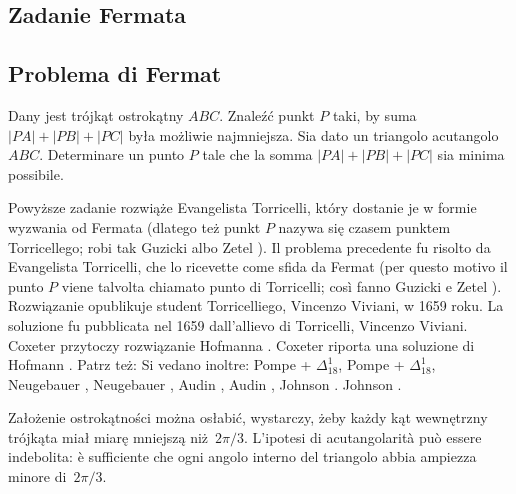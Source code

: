 %

\subsection{Zadanie Fermata} %
\subsection{Problema di Fermat} %

\begin{problem}
[zadanie Fermata] %
[problema di Fermat] %
\label{punkt_fermata}%
	Dany jest trójkąt ostrokątny $ABC$. %
	Znaleźć punkt $P$ taki, by suma $|PA| + |PB| + |PC|$ była możliwie najmniejsza. %
	Sia dato un triangolo acutangolo $ABC$. %
	Determinare un punto $P$ tale che la somma $|PA| + |PB| + |PC|$ sia minima possibile. %
\end{problem}

Powyższe zadanie rozwiąże Evangelista Torricelli, który dostanie je w formie wyzwania od Fermata (dlatego też punkt $P$ nazywa się czasem punktem Torricellego; robi tak Guzicki \cite[s. 224-228]{guzicki_2021} albo Zetel \cite[s. 157-164]{zetel_2020}). %
Il problema precedente fu risolto da Evangelista Torricelli, che lo ricevette come sfida da Fermat (per questo motivo il punto $P$ viene talvolta chiamato punto di Torricelli; così fanno Guzicki \cite[pp. 224-228]{guzicki_2021} e Zetel \cite[pp. 157-164]{zetel_2020}). %
Rozwiązanie opublikuje student Torricelliego, Vincenzo Viviani, w 1659 roku. %
La soluzione fu pubblicata nel 1659 dall'allievo di Torricelli, Vincenzo Viviani. %
Coxeter \cite[s. 37]{coxeter_1967} przytoczy rozwiązanie Hofmanna \cite{hofmann_1929}. %
Coxeter \cite[p. 37]{coxeter_1967} riporta una soluzione di Hofmann \cite{hofmann_1929}. %
Patrz też: %
Si vedano inoltre: %
Pompe \cite[s. 19-22]{pompe_2022} + $\Delta_{18}^1$, %
Pompe \cite[pp. 19-22]{pompe_2022} + $\Delta_{18}^1$, %
Neugebauer \cite[s. 117]{neugebauer_2018}, %
Neugebauer \cite[p. 117]{neugebauer_2018}, %
Audin \cite[s. 105]{audin_2003}, %
Audin \cite[p. 105]{audin_2003}, %
Johnson \cite[s. 221-222]{johnson_1929}. %
Johnson \cite[pp. 221-222]{johnson_1929}. %

Założenie ostrokątności można osłabić, wystarczy, żeby każdy kąt wewnętrzny trójkąta miał miarę mniejszą niż~$2\pi/3$. %
L'ipotesi di acutangolarità può essere indebolita: è sufficiente che ogni angolo interno del triangolo abbia ampiezza minore di~$2\pi/3$. %

